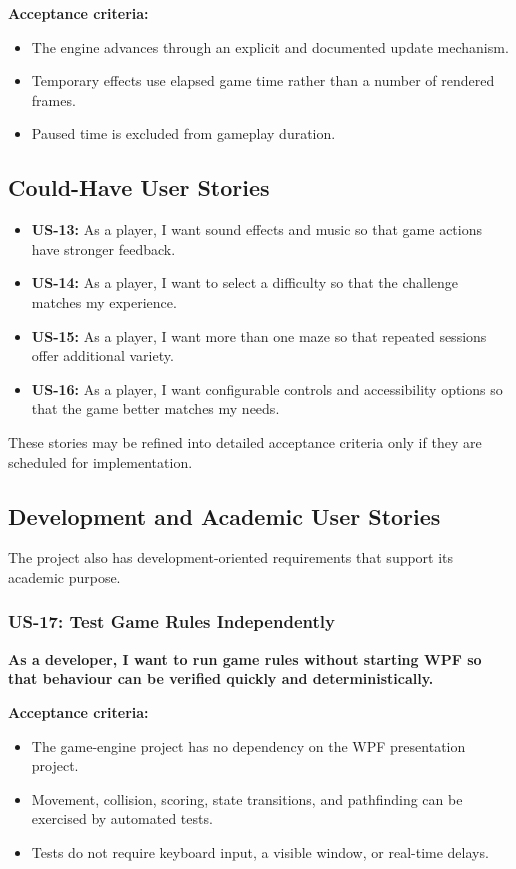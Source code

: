 \textbf{Acceptance criteria:}
\begin{itemize}
	\item The engine advances through an explicit and documented update mechanism.
	\item Temporary effects use elapsed game time rather than a number of rendered frames.
	\item Paused time is excluded from gameplay duration.
\end{itemize}

\subsection{Could-Have User Stories}

\begin{itemize}
	\item \textbf{US-13:} As a player, I want sound effects and music so that game actions have stronger feedback.
	\item \textbf{US-14:} As a player, I want to select a difficulty so that the challenge matches my experience.
	\item \textbf{US-15:} As a player, I want more than one maze so that repeated sessions offer additional variety.
	\item \textbf{US-16:} As a player, I want configurable controls and accessibility options so that the game better matches my needs.
\end{itemize}

These stories may be refined into detailed acceptance criteria only if they are scheduled for implementation.

\subsection{Development and Academic User Stories}

The project also has development-oriented requirements that support its academic purpose.

\subsubsection{US-17: Test Game Rules Independently}

\textbf{As a developer, I want to run game rules without starting WPF so that behaviour can be verified quickly and deterministically.}

\textbf{Acceptance criteria:}
\begin{itemize}
	\item The game-engine project has no dependency on the WPF presentation project.
	\item Movement, collision, scoring, state transitions, and pathfinding can be exercised by automated tests.
	\item Tests do not require keyboard input, a visible window, or real-time delays.
\end{itemize}

